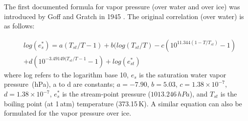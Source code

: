 The first documented formula for vapor pressure (over water and over ice) was introduced by Goff and Gratch in 1945 \cite{goff_gratch}. The original correlation (over water) is as follows:

\begin{equation}
\label{gratch}
\begin{split}
    &log({e}^{*}_{s}) = a(T_{st}/T - 1) + b(log(T_{st}/T) - c(10^{11.344(1-T/T_{st})} - 1) \\
    &+ d(10^{-3.49149(T_{st}/T - 1} -1) + log(e^{*}_{st})
\end{split}
\end{equation}
where log refers to the logarithm base 10, $e_{s}$ is the saturation water vapor pressure~(hPa), a to d are constants; $a = - 7.90$, $b=5.03$, $c=1.38\times10^{-7}$, $d=1.38\times10^{-7}$, $e^{*}_{s}$ is the stream-point pressure ($1013.246\,hPa$), and $T_{st}$ is the boiling point (at 1\,atm) temperature (373.15\,K). A similar equation can also be formulated for the vapor pressure over ice. 

